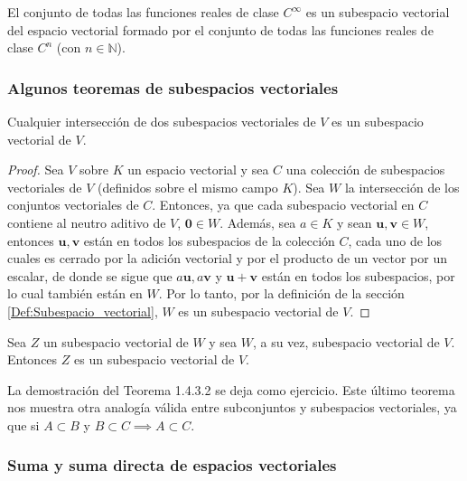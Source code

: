\documentclass[12pt,dvipsnames]{article}
\newenvironment{teorema}[2][Teorema]{\begin{trivlist}
\item[\hskip \labelsep {\bfseries #1}\hskip \labelsep {\bfseries #2.}]}{\end{trivlist}}
\begin{document}
\vspace{3mm}

El conjunto de todas las funciones reales de clase $C^{\infty}$ es un subespacio vectorial del espacio vectorial formado por el conjunto de todas las funciones reales de clase $C^n$ (con $n\in\mathbb{N}$).

\vspace{3mm}

\subsubsection{Algunos teoremas de subespacios vectoriales} \label{Teo:Subespacios_vectoriales}

\begin{teorema} {1.4.3.1} Cualquier intersección de dos subespacios vectoriales de $V$ es un subespacio vectorial de $V$.

\begin{proof}
    Sea $V$ sobre $K$ un espacio vectorial y sea $C$ una colección de subespacios vectoriales de $V$ (definidos sobre el mismo campo $K$). Sea $W$ la intersección de los conjuntos vectoriales de $C$. Entonces, ya que cada subespacio vectorial en $C$ contiene al neutro aditivo de $V$, $\mathbf{0}\in W$. Además, sea $a\in K$ y sean $\mathbf{u},\mathbf{v}\in W$, entonces $\mathbf{u},\mathbf{v}$ están en todos los subespacios de la colección $C$, cada uno de los cuales es cerrado por la adición vectorial y por el producto de un vector por un escalar, de donde se sigue que $a\mathbf{u}, a\mathbf{v}$ y $\mathbf{u}+\mathbf{v}$ están en todos los subespacios, por lo cual también están en $W$. Por lo tanto, por la definición de la sección \ref{Def:Subespacio_vectorial}, $W$ es un subespacio vectorial de $V$.
\end{proof}
\end{teorema}

\begin{teorema} {1.4.3.2} Sea $Z$ un subespacio vectorial de $W$ y sea $W$, a su vez, subespacio vectorial de $V$. Entonces $Z$ es un subespacio vectorial de $V$.
\end{teorema}

\noindent La demostración del Teorema 1.4.3.2 se deja como ejercicio. Este último teorema nos muestra otra analogía válida entre subconjuntos y subespacios vectoriales, ya que si $A \subset B$ y $B\subset C \implies A\subset C$.

\subsubsection{Suma y suma directa de espacios vectoriales}
\end{document}
